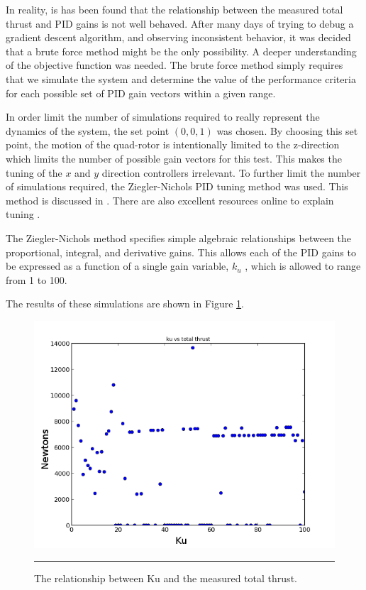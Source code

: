 In reality, is has been found that the relationship between the measured total thrust and PID gains is not well behaved. After many days of trying to debug a gradient descent algorithm, and observing inconsistent behavior, it was decided that a brute force method might be the only possibility. A deeper understanding of the objective function was needed. The brute force method simply requires that we simulate the system and determine the value of the performance criteria for each possible set of PID gain vectors within a given range. 

In order limit the number of simulations required to really represent the dynamics of the system, the set point $(0,0,1)$ was chosen. By choosing this set point, the motion of the quad-rotor is intentionally limited to the z-direction which limits the number of possible gain vectors for this test. This makes the tuning of the $x$ and $y$ direction controllers irrelevant. To further limit the number of simulations required, the Ziegler-Nichols PID tuning method was used. This method is discussed in \cite{ziegler1942optimum}. There are also excellent resources online to explain tuning \cite{znwiki}. 

The Ziegler-Nichols method specifies simple algebraic relationships between the proportional, integral, and derivative gains. This allows each of the PID gains to be expressed as a function of a single gain variable, $k_u$ , which is allowed to range from 1 to 100.




 The results of these simulations are shown in Figure \ref{fig:ku vs thrust}.

 
\begin{figure}[htbp]
	\centering
		\includegraphics{Figures/kuvsthrust.png}
		\rule{35em}{0.5pt}
	\caption[ku vs thrust]{The relationship between Ku and the measured total thrust.}
	\label{fig:ku vs thrust}
\end{figure}

